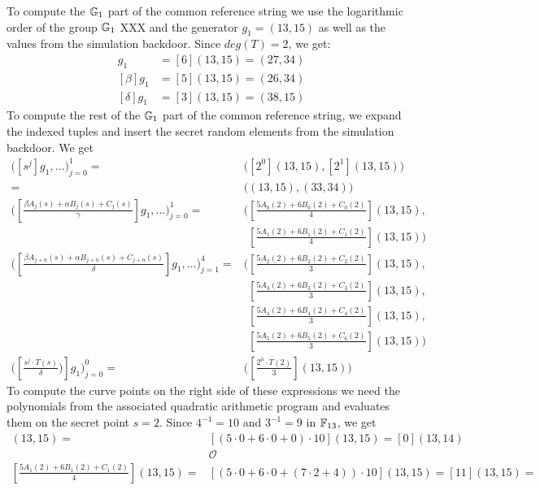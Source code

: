 \begin{example}
To compute the $\mathbb{G}_1$ part of the common reference string we use the logarithmic order of the group $\mathbb{G}_1$ XXX and the generator $g_1=(13,15)$ as well as the values from the simulation backdoor. Since $deg(T)=2$, we get:
\begin{align*}
[\alpha]g_1 & = [6](13,15) = (27,34) \\
[\beta]g_1 & = [5](13,15) = (26,34) \\
[\delta]g_1 & = [3](13,15) = (38,15)
\end{align*}
To compute the rest of the $\mathbb{G}_1$ part of the common reference string, we expand the indexed tuples and insert the secret random elements from the simulation backdoor. We get
\begin{align*}
\Big( [s^{j}]g_1,\ldots\Big) _{j=0}^{1} = 
 & \Big( [2^0](13,15), [2^1](13,15)\Big)  \\
 = & \Big((13,15),(33,34)\Big)\\
\Big([\frac{\beta A_{j}(s)+ \alpha B_{j}(s) + C_{j}(s)}{\gamma}]g_1,\ldots\Big)_{j=0}^1 =
 & \Big([\frac{5 A_{0}(2)+6 B_{0}(2)+C_{0}(2)}{4}](13,15),\\
 &\phantom{\Big(} [\frac{5 A_{1}(2)+6 B_{1}(2)+C_{1}(2)}{4}](13,15)\Big)\\
\Big([\frac{\beta A_{j+n}(s)+ \alpha B_{j+n}(s) + C_{j+n}(s)}{\delta}]g_1,\ldots\Big)_{j=1}^4 = 
&  \Big( [\frac{5 A_{2}(2)+ 6 B_{2}(2) + C_{2}(2)}{3}](13,15),\\ 
& \phantom{\Big(} [\frac{5 A_{3}(2)+ 6 B_{3}(2) + C_{3}(2)}{3}](13,15),\\
& \phantom{\Big(} [\frac{5 A_{4}(2)+ 6 B_{4}(2) + C_{4}(2)}{3}](13,15),\\ 
& \phantom{\Big(} [\frac{5 A_{5}(2)+ 6 B_{5}(2) + C_{6}(2)}{3}](13,15)\Big)\\
\Big([\frac{s^j\cdot T(s)}{\delta})]g_1\Big)_{j=0}^0 = & \Big([\frac{2^0\cdot T(2)}{3}](13,15)\Big) 
\end{align*}
To compute the curve points on the right side of these expressions we need the polynomials from the associated quadratic arithmetic program and evaluates them on the secret point $s=2$. Since $4^{-1}=10$ and $3^{-1}=9$ in $\mathbb{F}_{13}$, we get 
\begin{align*}
[\frac{5 A_{0}(2)+6 B_{0}(2)+C_{0}(2)}{4}](13,15) = 
 & [(5 \cdot 0 +6\cdot 0 + 0)\cdot 10](13,15) = [0](13,14)\\
 & \mathcal{O} \\
[\frac{5 A_{1}(2)+6 B_{1}(2)+C_{1}(2)}{4}](13,15) = 
 & [(5\cdot 0 +6\cdot 0 + (7\cdot 2 + 4))\cdot 10](13,15) = [11](13,15) = \\

\end{align*}
\end{example}
